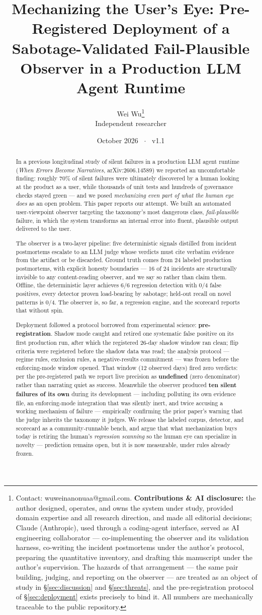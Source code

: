 \documentclass[11pt]{article}
\title{\textbf{Mechanizing the User's Eye: Pre-Registered Deployment of a
Sabotage-Validated Fail-Plausible Observer in a Production LLM Agent
Runtime}}
\author{%
  Wei Wu\thanks{Contact: wuweinanonuaa@gmail.com. \quad
  \textbf{Contributions \& AI disclosure:} the author designed, operates,
  and owns the system under study, provided domain expertise and all
  research direction, and made all editorial decisions; Claude
  (Anthropic), used through a coding-agent interface, served as AI
  engineering collaborator --- co-implementing the observer and its
  validation harness, co-writing the incident postmortems under the
  author's protocol, preparing the quantitative inventory, and drafting
  this manuscript under the author's supervision. The hazards of that
  arrangement --- the same pair building, judging, and reporting on the
  observer --- are treated as an object of study in
  \S\ref{sec:discussion} and \S\ref{sec:threats}, and the
  pre-registration protocol of \S\ref{sec:deployment} exists precisely
  to bind it. All numbers are mechanically traceable to the public
  repository.}\\
  \small Independent researcher}
\date{October 2026 ~$\cdot$~ v1.1}
\newcommand{\failplausible}{\emph{fail-plausible}}
\begin{document}
\maketitle

\begin{abstract}
\noindent
In a previous longitudinal study of silent failures in a production LLM
agent runtime (\emph{When Errors Become Narratives},
arXiv:2606.14589) we reported an uncomfortable finding: roughly 70\% of
silent failures were ultimately discovered by a human looking at the
product as a user, while thousands of unit tests and hundreds of
governance checks stayed green --- and we posed \emph{mechanizing even
part of what the human eye does} as an open problem. This paper reports
our attempt. We built an automated user-viewpoint observer targeting the
taxonomy's most dangerous class, \failplausible{} failure, in which the
system transforms an internal error into fluent, plausible output
delivered to the user.

The observer is a two-layer pipeline: five deterministic signals
distilled from incident postmortems escalate to an LLM judge whose
verdicts must cite verbatim evidence from the artifact or be discarded.
Ground truth comes from 24 labeled production postmortems, with explicit
honesty boundaries --- 16 of 24 incidents are structurally invisible to
any content-reading observer, and we say so rather than claim them.
Offline, the deterministic layer achieves 6/6 regression detection with
0/4 false positives, every detector proven load-bearing by sabotage;
held-out recall on novel patterns is 0/4. The observer is, so far, a
regression engine, and the scorecard reports that without spin.

Deployment followed a protocol borrowed from experimental science:
\textbf{pre-registration}. Shadow mode caught and retired one systematic
false positive on its first production run, after which the registered
26-day shadow window ran clean; flip criteria were registered before the
shadow data was read; the analysis protocol --- regime rules, exclusion
rules, a negative-results commitment --- was frozen before the
enforcing-mode window opened. That window (12 observed days) fired zero
verdicts: per the pre-registered path we report live precision as
\textbf{undefined} (zero denominator) rather than narrating quiet as
success. Meanwhile the observer produced \textbf{ten silent failures
of its own} during its development --- including polluting its own
evidence file, an enforcing-mode integration that was silently inert,
and twice accusing a working mechanism of failure --- empirically
confirming the prior paper's warning that the judge inherits the
taxonomy it judges. We release the labeled corpus,
detector, and scorecard as a community-runnable bench, and argue that
what mechanization buys today is retiring the human's \emph{regression
scanning} so the human eye can specialize in novelty --- prediction
remains open, but it is now measurable, under rules already frozen.
\end{abstract}
\end{document}
